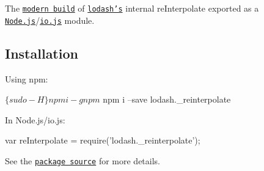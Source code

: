 The \href{https://github.com/lodash/lodash/wiki/Build-Differences}{\tt modern build} of \href{https://lodash.com/}{\tt lodash’s} internal {\ttfamily re\+Interpolate} exported as a \href{http://nodejs.org/}{\tt Node.\+js}/\href{https://iojs.org/}{\tt io.\+js} module.

\subsection*{Installation}

Using npm\+:


\begin{DoxyCode}
$ \{sudo -H\} npm i -g npm
$ npm i --save lodash.\_reinterpolate
\end{DoxyCode}


In Node.\+js/io.js\+:


\begin{DoxyCode}
var reInterpolate = require('lodash.\_reinterpolate');
\end{DoxyCode}


See the \href{https://github.com/lodash/lodash/blob/3.0.0-npm-packages/lodash._reinterpolate}{\tt package source} for more details. 